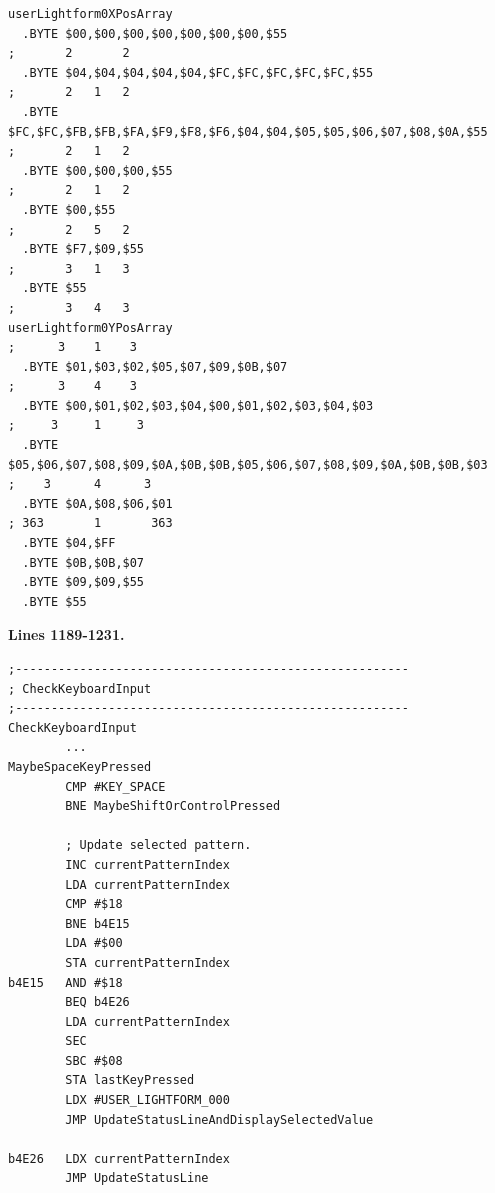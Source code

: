 \begin{lstlisting}[basicstyle=\ttfamily\tiny]
userLightform0XPosArray
  .BYTE $00,$00,$00,$00,$00,$00,$00,$55                                        ;       2       2      
  .BYTE $04,$04,$04,$04,$04,$FC,$FC,$FC,$FC,$FC,$55                            ;       2   1   2      
  .BYTE $FC,$FC,$FB,$FB,$FA,$F9,$F8,$F6,$04,$04,$05,$05,$06,$07,$08,$0A,$55    ;       2   1   2      
  .BYTE $00,$00,$00,$55                                                        ;       2   1   2      
  .BYTE $00,$55                                                                ;       2   5   2      
  .BYTE $F7,$09,$55                                                            ;       3   1   3      
  .BYTE $55                                                                    ;       3   4   3      
userLightform0YPosArray                                                        ;      3    1    3     
  .BYTE $01,$03,$02,$05,$07,$09,$0B,$07                                        ;      3    4    3     
  .BYTE $00,$01,$02,$03,$04,$00,$01,$02,$03,$04,$03                            ;     3     1     3    
  .BYTE $05,$06,$07,$08,$09,$0A,$0B,$0B,$05,$06,$07,$08,$09,$0A,$0B,$0B,$03    ;    3      4      3   
  .BYTE $0A,$08,$06,$01                                                        ; 363       1       363
  .BYTE $04,$FF
  .BYTE $0B,$0B,$07
  .BYTE $09,$09,$55                                                         
  .BYTE $55
\end{lstlisting}

\textbf{Lines 1189-1231. } 
\begin{lstlisting}[basicstyle=\ttfamily\scriptsize]
;-------------------------------------------------------
; CheckKeyboardInput
;-------------------------------------------------------
CheckKeyboardInput   
        ...
MaybeSpaceKeyPressed   
        CMP #KEY_SPACE
        BNE MaybeShiftOrControlPressed

        ; Update selected pattern.
        INC currentPatternIndex
        LDA currentPatternIndex
        CMP #$18
        BNE b4E15
        LDA #$00
        STA currentPatternIndex
b4E15   AND #$18
        BEQ b4E26
        LDA currentPatternIndex
        SEC 
        SBC #$08
        STA lastKeyPressed
        LDX #USER_LIGHTFORM_000
        JMP UpdateStatusLineAndDisplaySelectedValue

b4E26   LDX currentPatternIndex
        JMP UpdateStatusLine
\end{lstlisting}
\clearpage

